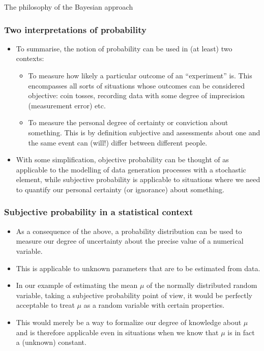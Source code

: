 \documentclass[10pt]{beamer}
\theoremstyle{definition}
\begin{document}
\begin{section}{The philosophy of the Bayesian approach}
\begin{frame}
\frametitle{Two interpretations of probability}
\begin{itemize}\itemsep1em
\item To summarise, the notion of probability can be used in (at least) two contexts:
	\begin{itemize}\itemsep1em
	\item To measure how likely a particular outcome of an ``experiment'' is. This encompasses all sorts of situations whose outcomes can be considered objective: coin tosses, recording data with some degree of imprecision (measurement error) etc.
	\item To measure the personal degree of certainty or conviction about something. This is by definition subjective and assessments about one and the same event can (will!) differ between different people. 
	\end{itemize}
\item With some simplification, objective probability can be thought of as applicable to the modelling of data generation processes with a stochastic element, while subjective probability is applicable to situations where we need to quantify our personal certainty (or ignorance) about something.
\end{itemize}
\end{frame}

\begin{frame}
\frametitle{Subjective probability in a statistical context}
\begin{itemize}\itemsep1em
\item As a consequence of the above, a probability distribution can be used to measure our degree of uncertainty about the precise value of a numerical variable.
\item This is applicable to unknown parameters that are to be estimated from data.
\item In our example of estimating the mean $ \mu $ of the normally distributed random variable, taking a subjective probability point of view, it would be perfectly acceptable to treat $ \mu $ as a random variable with certain properties.
\item This would merely be a way to formalize our degree of knowledge about $ \mu $ and is therefore applicable even in situations when we know that $ \mu $ is in fact a (unknown) constant.
\end{itemize}
\end{frame}


\end{section}
\end{document}
